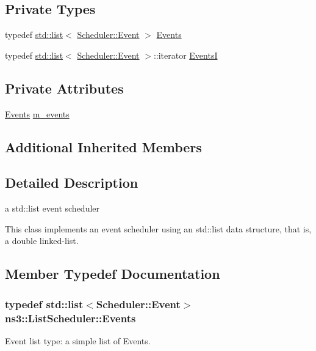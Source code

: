 \subsection*{Private Types}
\begin{DoxyCompactItemize}
\item 
typedef \hyperlink{openflow-interface_8h_afd9bcfa176617760671b67580f536fa7}{std\+::list}$<$ \hyperlink{structns3_1_1Scheduler_1_1Event}{Scheduler\+::\+Event} $>$ \hyperlink{classns3_1_1ListScheduler_a72b7bb5ff9d641105c1b3775e348d5b1}{Events}
\item 
typedef \hyperlink{openflow-interface_8h_afd9bcfa176617760671b67580f536fa7}{std\+::list}$<$ \hyperlink{structns3_1_1Scheduler_1_1Event}{Scheduler\+::\+Event} $>$\+::iterator \hyperlink{classns3_1_1ListScheduler_a4f5527fa75f2322d385e7303de55b530}{EventsI}
\end{DoxyCompactItemize}
\subsection*{Private Attributes}
\begin{DoxyCompactItemize}
\item 
\hyperlink{classns3_1_1ListScheduler_a72b7bb5ff9d641105c1b3775e348d5b1}{Events} \hyperlink{classns3_1_1ListScheduler_a7fe2d0905f9b58f33d0baa73a100efa4}{m\+\_\+events}
\end{DoxyCompactItemize}
\subsection*{Additional Inherited Members}


\subsection{Detailed Description}
a std\+::list event scheduler 

This class implements an event scheduler using an std\+::list data structure, that is, a double linked-\/list. 

\subsection{Member Typedef Documentation}
\subsubsection[{\texorpdfstring{Events}{Events}}]{\setlength{\rightskip}{0pt plus 5cm}typedef {\bf std\+::list}$<${\bf Scheduler\+::\+Event}$>$ {\bf ns3\+::\+List\+Scheduler\+::\+Events}\hspace{0.3cm}{\ttfamily [private]}}\hypertarget{classns3_1_1ListScheduler_a72b7bb5ff9d641105c1b3775e348d5b1}{}\label{classns3_1_1ListScheduler_a72b7bb5ff9d641105c1b3775e348d5b1}
Event list type\+: a simple list of Events. 
